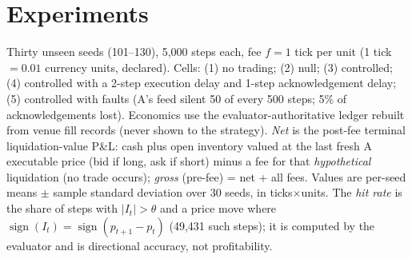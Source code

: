 \documentclass[10pt,twocolumn]{article}
\begin{document}
\section{Experiments}
Thirty unseen seeds (101--130), 5{,}000 steps each, fee $f=1$ tick per unit (1 tick $=0.01$ currency
units, declared). Cells: (1) no trading; (2) null; (3) controlled; (4) controlled with a 2-step
execution delay and 1-step acknowledgement delay; (5) controlled with faults (A's feed silent 50 of
every 500 steps; 5\% of acknowledgements lost). Economics use the evaluator-authoritative ledger rebuilt from venue fill records (never shown to the
strategy). \emph{Net} is the post-fee terminal liquidation-value P\&L: cash plus open inventory valued at
the last fresh A executable price (bid if long, ask if short) minus a fee for that \emph{hypothetical}
liquidation (no trade occurs); \emph{gross} (pre-fee) = net + all fees. Values are per-seed means $\pm$ sample standard deviation over 30 seeds,
in ticks$\times$units. The \emph{hit rate} is the share of steps with $|I_t|>\theta$ and a price move
where $\operatorname{sign}(I_t)=\operatorname{sign}(p_{t+1}-p_t)$ (49{,}431 such steps); it is computed by the
evaluator and is directional accuracy, not profitability.

\begin{table}[h]\centering\scriptsize\setlength{\tabcolsep}{3pt}
\caption{Per-seed means (fills, turnover in units). Gross/unit = gross / turnover.}
\end{table}
\end{document}
